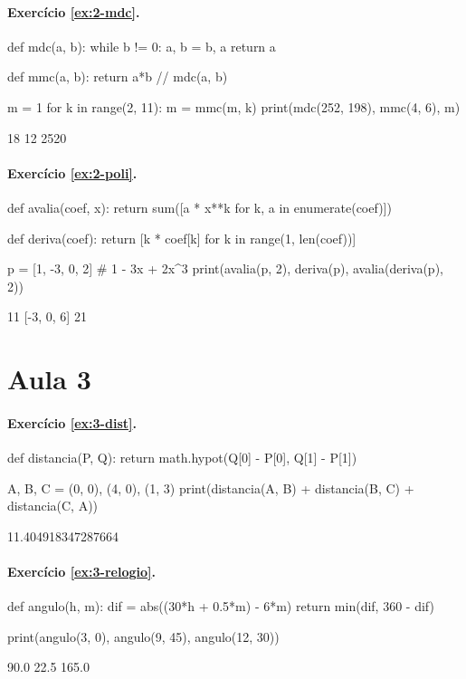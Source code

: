 \paragraph{Exercício \ref{ex:2-mdc}.}
\begin{entrada}
def mdc(a, b):
    while b != 0:
        a, b = b, a %
    return a

def mmc(a, b):
    return a*b // mdc(a, b)

m = 1
for k in range(2, 11):
    m = mmc(m, k)
print(mdc(252, 198), mmc(4, 6), m)
\end{entrada}
\begin{saida}
18 12 2520
\end{saida}

\paragraph{Exercício \ref{ex:2-poli}.}
\begin{entrada}
def avalia(coef, x):
    return sum([a * x**k for k, a in enumerate(coef)])

def deriva(coef):
    return [k * coef[k] for k in range(1, len(coef))]

p = [1, -3, 0, 2]          # 1 - 3x + 2x^3
print(avalia(p, 2), deriva(p), avalia(deriva(p), 2))
\end{entrada}
\begin{saida}
11 [-3, 0, 6] 21
\end{saida}

\section*{Aula 3}

\paragraph{Exercício \ref{ex:3-dist}.}
\begin{entrada}
def distancia(P, Q):
    return math.hypot(Q[0] - P[0], Q[1] - P[1])

A, B, C = (0, 0), (4, 0), (1, 3)
print(distancia(A, B) + distancia(B, C) + distancia(C, A))
\end{entrada}
\begin{saida}
11.404918347287664
\end{saida}

\paragraph{Exercício \ref{ex:3-relogio}.}
\begin{entrada}
def angulo(h, m):
    dif = abs((30*h + 0.5*m) - 6*m) %
    return min(dif, 360 - dif)

print(angulo(3, 0), angulo(9, 45), angulo(12, 30))
\end{entrada}
\begin{saida}
90.0 22.5 165.0
\end{saida}

